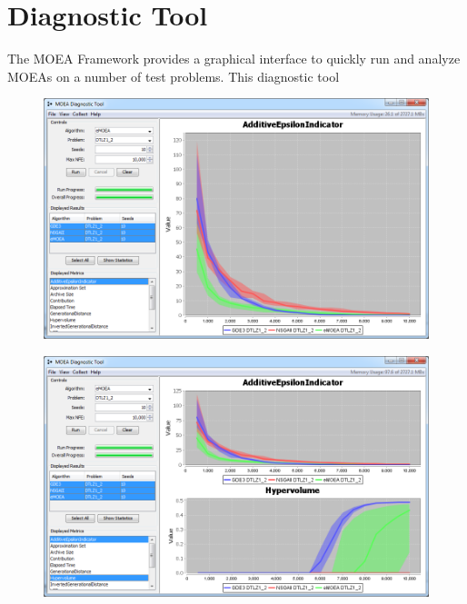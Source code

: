\chapter{Diagnostic Tool}

The MOEA Framework provides a graphical interface to quickly run and analyze MOEAs on a number of test problems.  This diagnostic tool 

\begin{figure}[h]
  \includegraphics[width=\linewidth]{diagnosticTool.png}
\end{figure}

\begin{figure}[h]
  \includegraphics[width=\linewidth]{diagnosticToolMultiselect.png}
\end{figure}

